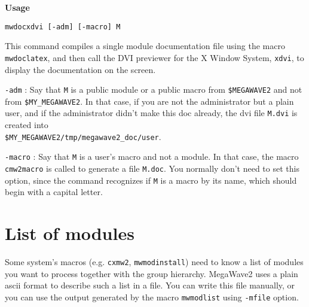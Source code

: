 \newpage

{\Large\bf Usage} \bigskip

\verb+mwdocxdvi [-adm] [-macro] M+

\Next

\Description
This command compiles a single module documentation file using the macro
\verb+mwdoclatex+, and then call the DVI previewer for the X Window System,
\verb+xdvi+, to display the documentation on the screen.

\Next

\Options

\verb+-adm+ : Say that \verb+M+ is a public module or a public macro
from \verb+$MEGAWAVE2+ and not from \verb+$MY_MEGAWAVE2+.
In that case, if you are not the administrator but a plain user, and if the
administrator didn't make this doc already, the dvi file \verb+M.dvi+ is created into \\
\verb+$MY_MEGAWAVE2/tmp/megawave2_doc/user+.

\verb+-macro+ : Say that  \verb+M+ is a user's macro and not a module.
In that case, the macro \verb+cmw2macro+ is called to generate a file
\verb+M.doc+. You normally don't need to set this option, since the 
command recognizes if \verb+M+ is a macro by its name, which should 
begin with a capital letter. 
        
\newpage

\section{List of modules}
\label{sysmacros_list}

Some system's macros (e.g. \verb+cxmw2+, \verb+mwmodinstall+) need to know a list of 
modules you want to process together with the group hierarchy.
MegaWave2 uses a plain ascii format to describe such a list in a file.
You can write this file manually, or you can use the output generated by the macro
\verb+mwmodlist+ using \verb+-mfile+ option.


